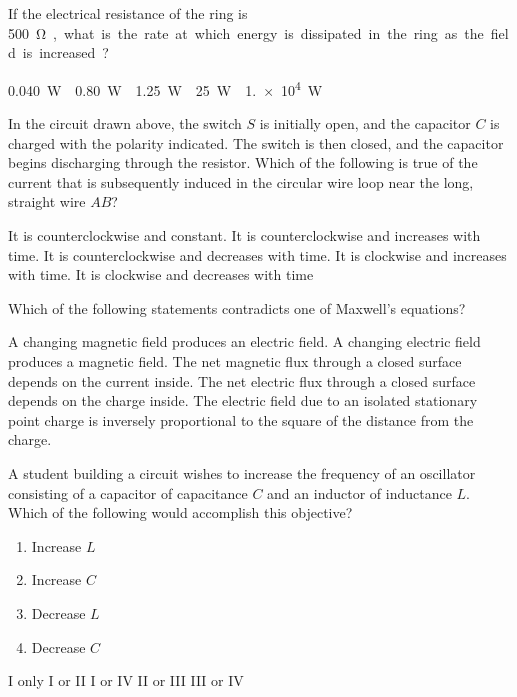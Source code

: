 \documentclass[12pt]{../../oss-apphys-exam}
\begin{document}
\begin{questions}
  \question If the electrical resistance of the ring is \SI{500}\ohm, what is
  the rate at which energy is dissipated in the ring as the field is increased?
  \begin{choices}
    \choice\SI{.040}\watt
    \choice\SI{.80}\watt
    \choice\SI{1.25}\watt
    \choice\SI{25}\watt
    \choice\SI{1.e4}\watt
  \end{choices}
  \label{emf2}
  \newpage
  
  \question In the circuit drawn above, the switch $S$ is initially open, and
  the capacitor $C$ is charged with the polarity indicated. The switch is then
  closed, and the capacitor begins discharging through the resistor. Which of
  the following is true of the current that is subsequently induced in the
  circular wire loop near the long, straight wire $AB$?
  \begin{choices}
    \choice It is counterclockwise and constant.
    \choice It is counterclockwise and increases with time.
    \choice It is counterclockwise and decreases with time.
    \choice It is clockwise and increases with time.
    \choice It is clockwise and decreases with time
  \end{choices}
  \newpage
  
  \question Which of the following statements contradicts one of Maxwell's
  equations?
  \begin{choices}
    \choice A changing magnetic field produces an electric field.
    \choice A changing electric field produces a magnetic field.
    \choice The net magnetic flux through a closed surface depends on the
    current inside.
    \choice The net electric flux through a closed surface depends on the
    charge inside.
    \choice The electric field due to an isolated stationary point charge is
    inversely proportional to the square of the distance from the charge.
  \end{choices}
  \newpage
  
  \question A student building a circuit wishes to increase the frequency of an
  oscillator consisting of a capacitor of capacitance $C$ and an inductor of
  inductance $L$. Which of the following would accomplish this objective?
  \begin{enumerate}[nosep,label={\Roman*.}]
  \item Increase $L$
  \item Increase $C$
  \item Decrease $L$
  \item Decrease $C$
  \end{enumerate}
  \begin{choices}
    \choice I only
    \choice I or II
    \choice I or IV
    \choice II or III
    \choice III or IV
  \end{choices}
  \newpage


\end{questions}
\end{document}
